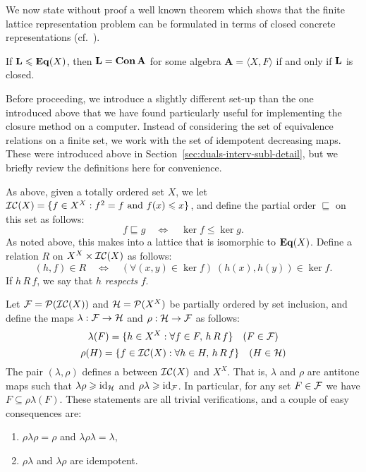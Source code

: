 We now state without proof a well known theorem which shows that the finite lattice
representation problem can be formulated in terms of closed concrete
representations (cf.~\cite{Jonsson:1972}).
\begin{theorem}\label{Concrete-thm-3}
  If $\mathbf{L} \leqslant \mathbf{Eq}(X)$, then $\mathbf{L}= \mathbf{Con\,}\mathbf{A}$ for some algebra 
  $\mathbf{A} = \langle X, F\rangle$ if and only if $\mathbf{L}$ is closed.
\end{theorem}

Before proceeding, we introduce a slightly different set-up than the
one introduced above that we have found particularly useful
for implementing the closure method on a computer. Instead of considering the
set of equivalence relations on a finite set, we work with the set of idempotent
decreasing maps.  These were introduced above in
Section~\ref{sec:duals-interv-subl-detail}, but we briefly review the definitions here
for convenience.

As above, given a totally ordered set $X$, 
we let $\mathcal{IC}(X) = \{f\in X^X: f^2 = f \text{ and } f(x) \leqslant x\}$, and 
define the partial order $\sqsubseteq$ on this set as follows:
\[
f\sqsubseteq g \quad \Leftrightarrow \quad \ker f \leq \ker g.  
\]
As noted above, 
this makes \icx into a lattice that is isomorphic to $\mathbf{Eq}(X)$.   
Define a relation $R$ on $X^X \times \mathcal{IC}(X)$ as follows: 
\[
(h,f) \in R \quad \Leftrightarrow \quad (\forall (x,y) \in \ker f)\; (h(x),h(y))
\in \ker f.
\]
If $h\, R\, f$, we say that  $h$ \emph{respects} $f$.

Let $\mathcal{F} = \mathcal{P}(\mathcal{IC}(X))$ and $\mathcal{H} = \mathcal{P}(X^X)$ be partially ordered by set
inclusion, and define the maps 
$\lambda: \mathcal{F} \rightarrow \mathcal{H}$ and $\rho: \mathcal{H} \rightarrow \mathcal{F}$ as follows:
\[
\lambda(F) = \{h\in X^X: \forall f\in F,\, h\, R \,f\} \quad (F \in \mathcal{F})
\]
\[
\rho(H) = \{f\in \mathcal{IC}(X): \forall h\in H,\, h\, R\, f\} \quad (H \in \mathcal{H})
\]
The pair $(\lambda, \rho)$ defines a  between
$\mathcal{IC}(X)$ and $X^X$.  That is, $\lambda$ and $\rho$ are 
antitone %
maps such that $\lambda \rho \geqslant \operatorname{id}_{\mathcal{H}}$ and $\rho
\lambda \geqslant \operatorname{id}_{\mathcal{F}}$.  In particular, for any set $F \in \mathcal{F}$ we have 
$F \subseteq \rho \lambda (F)$.  These statements are all trivial verifications, and
a couple of easy consequences are:
\begin{enumerate}
\item  $\rho\lambda\rho = \rho$ and $\lambda\rho \lambda= \lambda$,
\item $\rho \lambda$ and $\lambda \rho$ are idempotent.
\end{enumerate}

